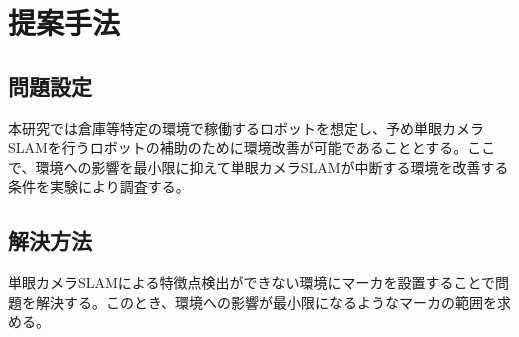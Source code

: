\chapter{提案手法}\label{chap:method}

\section{問題設定}

本研究では倉庫等特定の環境で稼働するロボットを想定し、予め単眼カメラSLAMを行うロボットの補助のために環境改善が可能であることとする。ここで、環境への影響を最小限に抑えて単眼カメラSLAMが中断する環境を改善する条件を実験により調査する。

\section{解決方法}

単眼カメラSLAMによる特徴点検出ができない環境にマーカを設置することで問題を解決する。このとき、環境への影響が最小限になるようなマーカの範囲を求める。
